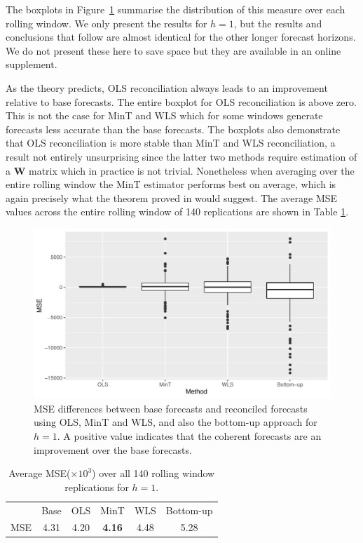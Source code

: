 \documentclass[12pt]{article}
\theoremstyle{definition}
\begin{document}
The boxplots in Figure~\ref{fig:BaseVSRecon_Fc} summarise the distribution of this measure over each rolling window. We only present the results for $h=1$, but the results and conclusions that follow are almost identical for the other longer forecast horizons. We do not present these here to save space but they are available {\color{blue} in an online supplement.}

As the theory predicts, OLS reconciliation always leads to an improvement relative to base forecasts. The entire boxplot for OLS reconciliation is above zero. This is not the case for MinT and WLS which for some windows generate forecasts less accurate than the base forecasts. The boxplots also demonstrate that OLS reconciliation is more stable than MinT and WLS reconciliation, a result not entirely unsurprising since the latter two methods require estimation of a $\bm{W}$ matrix which in practice is not trivial. Nonetheless when averaging over the entire rolling window the MinT estimator performs best on average, which is again precisely what the theorem proved in \citet{WicEtAl2019} would suggest. The average MSE values across the entire rolling window of 140 replications are shown in Table \ref{tab:AveraveDifferences}.

\begin{figure}[!hbt]
    \centering
    \small
    \includegraphics[width = \textwidth]{Figs/BoxPlot.pdf}
    \caption{MSE differences between base forecasts and reconciled forecasts using OLS, MinT and WLS, and also the bottom-up approach for $h = 1$. A positive value indicates that the coherent forecasts are an improvement over the base forecasts.}\label{fig:BaseVSRecon_Fc}
\end{figure}

\begin{table}[!hbt]
\caption {Average {MSE($\times 10^3$)} over all 140 rolling window replications for $h=1$.}\label{tab:AveraveDifferences}
  \centering \tabcolsep=0.4cm
  \begin{tabular}{lccccc}
  \toprule
          & Base & OLS & MinT & WLS & Bottom-up \\
   MSE    & 4.31 & 4.20 & \textbf{4.16} & 4.48 & 5.28 \\
  \bottomrule
  \end{tabular}
\end{table}
\end{document}

